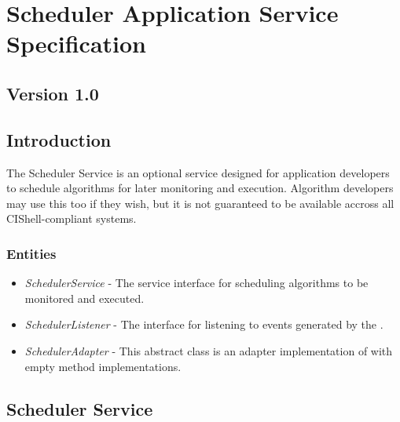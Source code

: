 \chapter{Scheduler Application Service Specification}

\section*{Version 1.0}

\section{Introduction}

The Scheduler Service is an optional service designed for application developers
to schedule algorithms for later monitoring and execution. Algorithm developers
may use this too if they wish, but it is not guaranteed to be available accross
all CIShell-compliant systems.

\subsection{Entities}

\begin{itemize}
  \item \textit{SchedulerService} - The service interface for scheduling
  algorithms to be monitored and executed.
  \item \textit{SchedulerListener} - The interface for listening to events
  generated by the .
  \item \textit{SchedulerAdapter} - This abstract class is an adapter
  implementation of  with empty method
  implementations.
\end{itemize}

\section{Scheduler Service}


\orgcishellappservicescheduler{}
